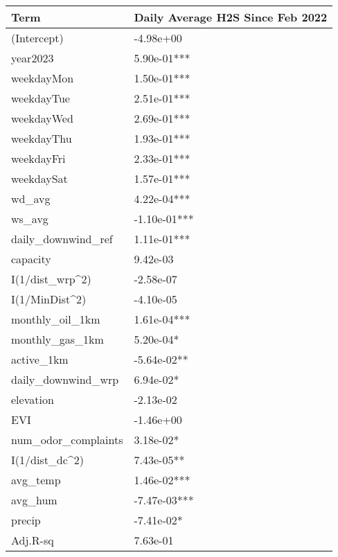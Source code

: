 
\begin{tabular}{l|l}
\hline
Term & Daily Average H2S Since Feb 2022\\
\hline
(Intercept) & -4.98e+00\\
\hline
year2023 & 5.90e-01***\\
\hline
weekdayMon & 1.50e-01***\\
\hline
weekdayTue & 2.51e-01***\\
\hline
weekdayWed & 2.69e-01***\\
\hline
weekdayThu & 1.93e-01***\\
\hline
weekdayFri & 2.33e-01***\\
\hline
weekdaySat & 1.57e-01***\\
\hline
wd\_avg & 4.22e-04***\\
\hline
ws\_avg & -1.10e-01***\\
\hline
daily\_downwind\_ref & 1.11e-01***\\
\hline
capacity & 9.42e-03\\
\hline
I(1/dist\_wrp\textasciicircum{}2) & -2.58e-07\\
\hline
I(1/MinDist\textasciicircum{}2) & -4.10e-05\\
\hline
monthly\_oil\_1km & 1.61e-04***\\
\hline
monthly\_gas\_1km & 5.20e-04*\\
\hline
active\_1km & -5.64e-02**\\
\hline
daily\_downwind\_wrp & 6.94e-02*\\
\hline
elevation & -2.13e-02\\
\hline
EVI & -1.46e+00\\
\hline
num\_odor\_complaints & 3.18e-02*\\
\hline
I(1/dist\_dc\textasciicircum{}2) & 7.43e-05**\\
\hline
avg\_temp & 1.46e-02***\\
\hline
avg\_hum & -7.47e-03***\\
\hline
precip & -7.41e-02*\\
\hline
Adj.R-sq & 7.63e-01\\
\hline
\end{tabular}

